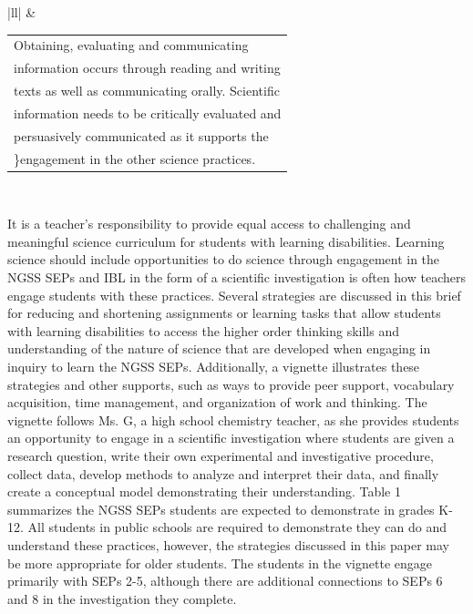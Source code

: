 \documentclass[11pt]{sig-alternate}
\begin{document}
\begin{large}
\begin{table}[]
{\begin{tabular}{|ll|}
 &
  \begin{tabular}[c]{@{}l@{}}Obtaining, evaluating and communicating \\ information occurs through reading and writing \\ texts as well as communicating orally. Scientific \\ information needs to be critically evaluated and \\ persuasively communicated as it supports the \\ \}engagement in the other science practices.\end{tabular} \\ \hline
\end{tabular}%
}
\end{table}

It is a teacher's responsibility to provide equal access to challenging and meaningful science curriculum for students with learning disabilities. Learning science should include opportunities to do science through engagement in the NGSS SEPs and IBL in the form of a scientific investigation is often how teachers engage students with these practices. Several strategies are discussed in this brief for reducing and shortening assignments or learning tasks that allow students with learning disabilities to access the higher order thinking skills and understanding of the nature of science that are developed when engaging in inquiry to learn the NGSS SEPs. Additionally, a vignette illustrates these strategies and other supports, such as ways to provide peer support, vocabulary acquisition, time management, and organization of work and thinking. The vignette follows Ms. G, a high school chemistry teacher, as she provides students an opportunity to engage in a scientific investigation where students are given a research question, write their own experimental and investigative procedure, collect data, develop methods to analyze and interpret their data, and finally create a conceptual model demonstrating their understanding. Table 1 summarizes the NGSS SEPs students are expected to demonstrate in grades K-12. All students in public schools are required to demonstrate they can do and understand these practices, however, the strategies discussed in this paper may be more appropriate for older students. The students in the vignette engage primarily with SEPs 2-5, although there are additional connections to SEPs 6 and 8 in the investigation they complete. 


\end{large}
\end{document}
